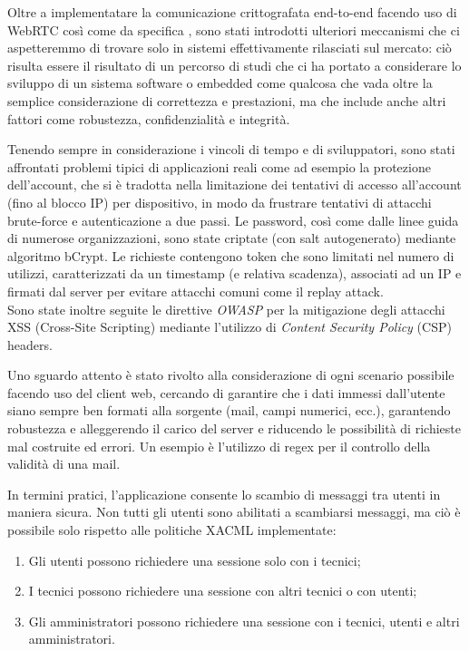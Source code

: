 Oltre a implementatare la comunicazione crittografata end-to-end facendo uso di WebRTC così come da specifica , sono stati introdotti ulteriori meccanismi che ci aspetteremmo di trovare solo in sistemi effettivamente rilasciati sul mercato: ciò risulta essere il risultato di un percorso di studi che ci ha portato a considerare lo sviluppo di un sistema software o embedded come qualcosa che vada oltre la semplice considerazione di correttezza e prestazioni, ma che include anche altri fattori come robustezza, confidenzialità e integrità.

Tenendo sempre in considerazione i vincoli di tempo e di sviluppatori, sono stati affrontati problemi tipici di applicazioni reali come ad esempio la protezione dell'account, che si è tradotta nella limitazione dei tentativi di accesso all'account (fino al blocco IP) per dispositivo, in modo da frustrare tentativi di attacchi brute-force e autenticazione a due passi. Le password, così come dalle linee guida di numerose organizzazioni, sono state criptate (con salt autogenerato) mediante algoritmo bCrypt. Le richieste contengono token che sono limitati nel numero di utilizzi, caratterizzati da un timestamp (e relativa scadenza), associati ad un IP e firmati dal server per evitare attacchi comuni come il replay attack.\\
Sono state inoltre seguite le direttive \textit{OWASP} per la mitigazione degli attacchi XSS (Cross-Site Scripting) mediante l'utilizzo di \textit{Content Security Policy} (CSP) headers.

Uno sguardo attento è stato rivolto alla considerazione di ogni scenario possibile facendo uso del client web, cercando di garantire che i dati immessi dall'utente siano sempre ben formati alla sorgente (mail, campi numerici, ecc.), garantendo robustezza e alleggerendo il carico del server e riducendo le possibilità di richieste mal costruite ed errori. Un esempio è l'utilizzo di regex per il controllo della validità di una mail.

In termini pratici, l'applicazione consente lo scambio di messaggi tra utenti in maniera sicura. Non tutti gli utenti sono abilitati a scambiarsi messaggi, ma ciò è possibile solo rispetto alle politiche XACML implementate:
\begin{enumerate}
	\item Gli utenti possono richiedere una sessione solo con i tecnici;
	\item I tecnici possono richiedere una sessione con altri tecnici o con utenti;
	\item Gli amministratori possono richiedere una sessione con i tecnici, utenti e altri amministratori.
	\end{enumerate}
\newpage